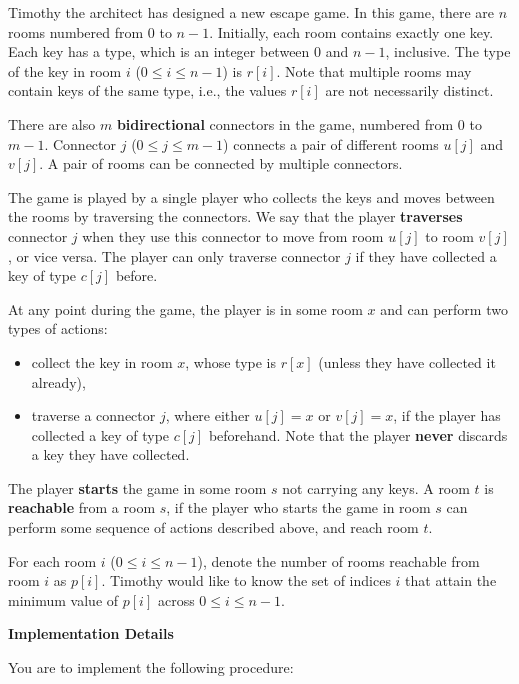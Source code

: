 Timothy the architect has designed a new escape game. In this game, there are $n$ rooms numbered from $0$ to $n-1$. Initially, each room contains exactly one key. Each key has a type, which is an integer between $0$ and $n-1$, inclusive. The type of the key in room $i$ ($0 \leq i \leq n-1$) is $r[i]$. Note that multiple rooms may contain keys of the same type, i.e., the values $r[i]$ are not necessarily
distinct.

There are also $m$ \textbf{bidirectional} connectors in the game, numbered from $0$ to $m-1$. Connector $j$ ($0 \leq j \leq m-1$) connects a pair of different rooms $u[j]$ and $v[j]$. A pair of rooms can be connected by multiple connectors.

The game is played by a single player who collects the keys and moves between the rooms by
traversing the connectors. We say that the player \textbf{traverses} connector $j$ when they use this
connector to move from room $u[j]$ to room $v[j]$, or vice versa. The player can only traverse connector $j$ if they have collected a key of type $c[j]$ before.

At any point during the game, the player is in some room $x$ and can perform two types of actions:
\begin{itemize}
\item collect the key in room $x$, whose type is $r[x]$ (unless they have collected it already),
\item traverse a connector $j$, where either $u[j]=x$ or $v[j]=x$, if the player has collected a key of type $c[j]$ beforehand. Note that the player \textbf{never} discards a key they have collected.
\end{itemize}

The player \textbf{starts} the game in some room $s$ not carrying any keys. A room $t$ is \textbf{reachable} from a room $s$, if the player who starts the game in room $s$ can perform some sequence of actions described
above, and reach room $t$.

For each room $i$ ($0 \leq i \leq n-1$), denote the number of rooms reachable from room $i$ as $p[i]$. Timothy would like to know the set of indices $i$ that attain the minimum value of $p[i]$ across $0 \leq i \leq n-1$.

\textbf{Implementation Details}

You are to implement the following procedure:

